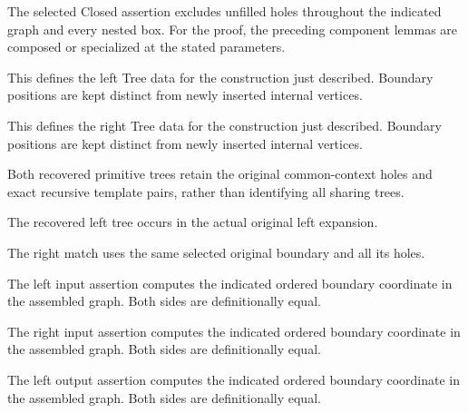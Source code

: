 The selected Closed assertion excludes unfilled holes throughout the indicated graph and every nested box.
For the proof, the preceding component lemmas are composed or specialized at the stated parameters.
\par{}

This defines the left Tree data for the construction just described. Boundary positions are kept distinct from newly inserted internal vertices.
\par{}

This defines the right Tree data for the construction just described. Boundary positions are kept distinct from newly inserted internal vertices.
\par{}

Both recovered primitive trees retain the original common-context holes and exact recursive template pairs, rather than identifying all sharing trees.
\par{}

The recovered left tree occurs in the actual original left expansion.
\par{}

The right match uses the same selected original boundary and all its holes.
\par{}

The left input assertion computes the indicated ordered boundary coordinate in the assembled graph.
Both sides are definitionally equal.
\par{}

The right input assertion computes the indicated ordered boundary coordinate in the assembled graph.
Both sides are definitionally equal.
\par{}

The left output assertion computes the indicated ordered boundary coordinate in the assembled graph.
Both sides are definitionally equal.
\par{}


